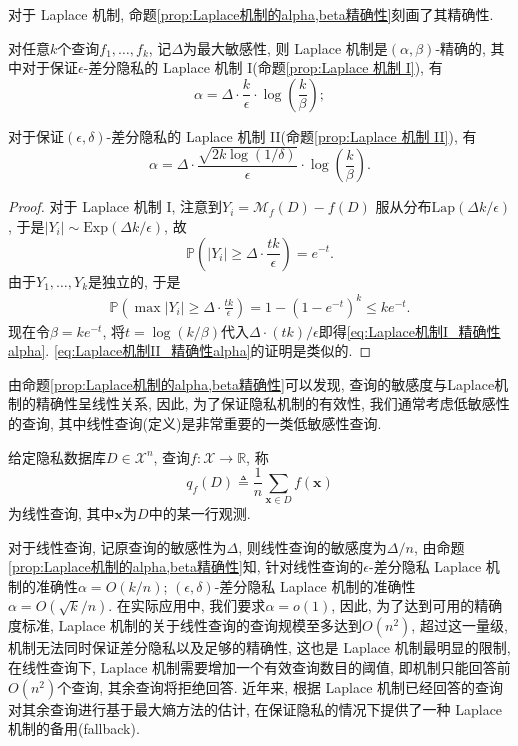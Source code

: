对于 Laplace 机制, 命题\ref{prop:Laplace机制的alpha,beta精确性}刻画了其精确性.
\begin{prop}\label{prop:Laplace机制的alpha,beta精确性}
  对任意$k$个查询$f_1, \dots, f_k$, 记$\Delta$为最大敏感性, 则 Laplace 机制是$(\alpha, \beta)$-精确的, 其中对于保证$\epsilon$-差分隐私的 Laplace 机制 I(命题\ref{prop:Laplace 机制 I}), 有
  \begin{equation}\label{eq:Laplace机制I_精确性alpha}
    \alpha = \Delta\cdot\frac{k}{\epsilon}\cdot\log\left(\frac{k}{\beta}\right);
  \end{equation}
    
  对于保证$(\epsilon, \delta)$-差分隐私的 Laplace 机制 II(命题\ref{prop:Laplace 机制 II}), 有
  \begin{equation}\label{eq:Laplace机制II_精确性alpha}
    \alpha = \Delta\cdot\frac{\sqrt{2k\log(1/\delta)}}{\epsilon}\cdot\log\left(\frac{k}{\beta}\right).
  \end{equation}
\end{prop}
\begin{proof}
  对于 Laplace 机制 I, 注意到$Y_i = \mathcal{M}_f(D) - f(D)$ 服从分布$\mathrm{Lap}(\Delta k/\epsilon)$, 于是$|Y_i| \sim \mathrm{Exp}(\Delta k/\epsilon)$, 故
  \[
    \mathbb P\left(|Y_i| \ge \Delta \cdot \frac{tk}{\epsilon}\right) = e^{-t}.
  \]
  由于$Y_1, \dots, Y_k$是独立的, 于是
  \[
    \begin{split}
      \mathbb P\left(\max|Y_i| \ge \Delta \cdot \frac{tk}{\epsilon}\right) = 1 - \left(1 - e^{-t}\right)^k \le ke^{-t}.
    \end{split}
  \]
  现在令$\beta = ke^{-t}$, 将$t = \log(k/\beta)$代入$\Delta\cdot (tk)/\epsilon$即得\eqref{eq:Laplace机制I_精确性alpha}. \eqref{eq:Laplace机制II_精确性alpha}的证明是类似的.
\end{proof}

由命题\ref{prop:Laplace机制的alpha,beta精确性}可以发现, 查询的敏感度与Laplace机制的精确性呈线性关系, 因此, 为了保证隐私机制的有效性, 我们通常考虑低敏感性的查询, 其中线性查询(定义)是非常重要的一类低敏感性查询.
\begin{defn}[线性查询]\label{defn:线性查询}
  给定隐私数据库$D \in \mathcal{X}^n$, 查询$f\colon \mathcal{X} \to \mathbb R$, 称
  \[
  q_f(D) \triangleq \frac{1}{n} \sum_{\mathbf{x}\in D} f(\mathbf{x})
  \]
  为线性查询, 其中$\mathbf{x}$为$D$中的某一行观测.
\end{defn}
对于线性查询, 记原查询的敏感性为$\Delta$, 则线性查询的敏感度为$\Delta/n$, 由命题\ref{prop:Laplace机制的alpha,beta精确性}知, 针对线性查询的$\epsilon$-差分隐私 Laplace 机制的准确性$\alpha = O(k/n)$; $(\epsilon, \delta)$-差分隐私 Laplace 机制的准确性$\alpha = O \left(\sqrt{k}/n\right)$. 在实际应用中, 我们要求$\alpha = o(1)$, 因此, 为了达到可用的精确度标准, Laplace 机制的关于线性查询的查询规模至多达到$O(n^2)$, 超过这一量级, 机制无法同时保证差分隐私以及足够的精确性, 这也是 Laplace 机制最明显的限制, 在线性查询下, Laplace 机制需要增加一个有效查询数目的阈值, 即机制只能回答前$O(n^2)$个查询, 其余查询将拒绝回答. 近年来, \parencite{chen2012integrating} 根据 Laplace 机制已经回答的查询对其余查询进行基于最大熵方法的估计, 在保证隐私的情况下提供了一种 Laplace 机制的备用(fallback).

